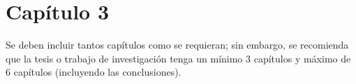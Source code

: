 \chapter{Capítulo 3}
Se deben incluir tantos capítulos como se requieran; sin embargo, se recomienda que la tesis  o trabajo de investigación tenga un mínimo 3 capítulos y máximo de 6 capítulos (incluyendo las conclusiones).\\